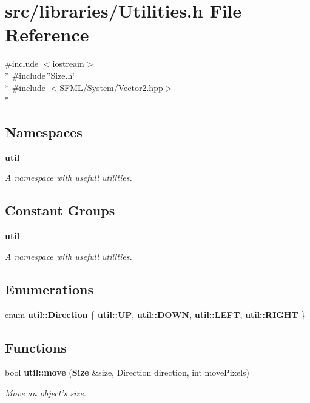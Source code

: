 \section{src/libraries/\-Utilities.h File Reference}
\label{_utilities_8h}
{\ttfamily \#include $<$iostream$>$}\\*
{\ttfamily \#include \char`\"{}Size.\-h\char`\"{}}\\*
{\ttfamily \#include $<$S\-F\-M\-L/\-System/\-Vector2.\-hpp$>$}\\*
\subsection*{Namespaces}
\begin{DoxyCompactItemize}
\item 
{\bf util}
\begin{DoxyCompactList}\small\item\em A namespace with usefull utilities. \end{DoxyCompactList}\end{DoxyCompactItemize}
\subsection*{Constant Groups}
\begin{DoxyCompactItemize}
\item 
{\bf util}
\begin{DoxyCompactList}\small\item\em A namespace with usefull utilities. \end{DoxyCompactList}\end{DoxyCompactItemize}
\subsection*{Enumerations}
\begin{DoxyCompactItemize}
\item 
enum {\bf util\-::\-Direction} \{ {\bf util\-::\-U\-P}, 
{\bf util\-::\-D\-O\-W\-N}, 
{\bf util\-::\-L\-E\-F\-T}, 
{\bf util\-::\-R\-I\-G\-H\-T}
 \}
\end{DoxyCompactItemize}
\subsection*{Functions}
\begin{DoxyCompactItemize}
\item 
bool {\bf util\-::move} ({\bf Size} \&size, Direction direction, int move\-Pixels)
\begin{DoxyCompactList}\small\item\em Move an object's size. \end{DoxyCompactList}\end{DoxyCompactItemize}
